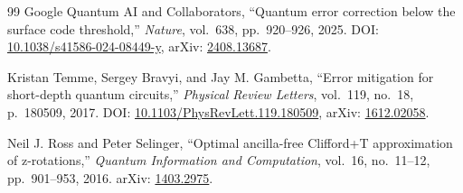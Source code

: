 \begin{thebibliography}{99}
Google Quantum AI and Collaborators, ``Quantum error correction below the surface code threshold,'' \emph{Nature}, vol.~638, pp.~920--926, 2025. DOI: \href{https://doi.org/10.1038/s41586-024-08449-y}{10.1038/s41586-024-08449-y}, arXiv: \href{https://arxiv.org/abs/2408.13687}{2408.13687}.

Kristan Temme, Sergey Bravyi, and Jay M. Gambetta, ``Error mitigation for short-depth quantum circuits,'' \emph{Physical Review Letters}, vol.~119, no.~18, p.~180509, 2017. DOI: \href{https://doi.org/10.1103/PhysRevLett.119.180509}{10.1103/PhysRevLett.119.180509}, arXiv: \href{https://arxiv.org/abs/1612.02058}{1612.02058}.

Neil J. Ross and Peter Selinger, ``Optimal ancilla-free Clifford+T approximation of z-rotations,'' \emph{Quantum Information and Computation}, vol.~16, no.~11--12, pp.~901--953, 2016. arXiv: \href{https://arxiv.org/abs/1403.2975}{1403.2975}.

\end{thebibliography}
